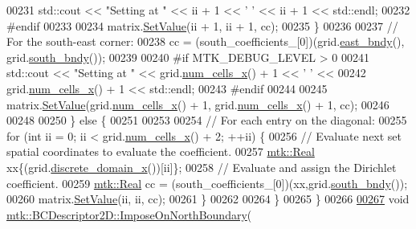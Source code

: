 \begin{DoxyCode}
00231       std::cout << \textcolor{stringliteral}{"Setting at "} << ii + 1 << \textcolor{charliteral}{' '} << ii + 1 << std::endl;
00232 \textcolor{preprocessor}{      #endif}
00233 
00234       matrix.\hyperlink{classmtk_1_1DenseMatrix_a784ce5784109ac86bfb9d8562b334b13}{SetValue}(ii + 1, ii + 1, cc);
00235     \}
00236 
00237     \textcolor{comment}{// For the south-east corner:}
00238     cc = (south\_coefficients\_[0])(grid.\hyperlink{classmtk_1_1UniStgGrid2D_a03f689eb29a6369b82ce1207c655d5ff}{east\_bndy}(), grid.\hyperlink{classmtk_1_1UniStgGrid2D_a1442eaf219f099d0ebf46a170fdebf92}{south\_bndy}());
00239 
00240 \textcolor{preprocessor}{    #if MTK\_DEBUG\_LEVEL > 0}
00241     std::cout << \textcolor{stringliteral}{"Setting at "} << grid.\hyperlink{classmtk_1_1UniStgGrid2D_a2d182866a398aba8e4829590e85bf939}{num\_cells\_x}() + 1 << \textcolor{charliteral}{' '} <<
00242       grid.\hyperlink{classmtk_1_1UniStgGrid2D_a2d182866a398aba8e4829590e85bf939}{num\_cells\_x}() + 1 << std::endl;
00243 \textcolor{preprocessor}{    #endif}
00244 
00245     matrix.\hyperlink{classmtk_1_1DenseMatrix_a784ce5784109ac86bfb9d8562b334b13}{SetValue}(grid.\hyperlink{classmtk_1_1UniStgGrid2D_a2d182866a398aba8e4829590e85bf939}{num\_cells\_x}() + 1, grid.\hyperlink{classmtk_1_1UniStgGrid2D_a2d182866a398aba8e4829590e85bf939}{num\_cells\_x}() + 1, cc);
00246 
00248 
00250   \} \textcolor{keywordflow}{else} \{
00251 
00253 
00254     \textcolor{comment}{// For each entry on the diagonal:}
00255     \textcolor{keywordflow}{for} (\textcolor{keywordtype}{int} ii = 0; ii < grid.\hyperlink{classmtk_1_1UniStgGrid2D_a2d182866a398aba8e4829590e85bf939}{num\_cells\_x}() + 2; ++ii) \{
00256       \textcolor{comment}{// Evaluate next set spatial coordinates to evaluate the coefficient.}
00257       \hyperlink{group__c01-roots_gac080bbbf5cbb5502c9f00405f894857d}{mtk::Real} xx\{(grid.\hyperlink{classmtk_1_1UniStgGrid2D_ab2f70cf5cd0a2d5486992d9f2f8baa4a}{discrete\_domain\_x}())[ii]\};
00258       \textcolor{comment}{// Evaluate and assign the Dirichlet coefficient.}
00259       \hyperlink{group__c01-roots_gac080bbbf5cbb5502c9f00405f894857d}{mtk::Real} cc = (south\_coefficients\_[0])(xx,grid.\hyperlink{classmtk_1_1UniStgGrid2D_a1442eaf219f099d0ebf46a170fdebf92}{south\_bndy}());
00260       matrix.\hyperlink{classmtk_1_1DenseMatrix_a784ce5784109ac86bfb9d8562b334b13}{SetValue}(ii, ii, cc);
00261     \}
00262 
00264   \}
00265 \}
00266 
\hypertarget{mtk__bc__descriptor__2d_8cc_source_l00267}{}\hyperlink{classmtk_1_1BCDescriptor2D_a6062894dbe7c6f42a3bbcc54f2f8973d}{00267} \textcolor{keywordtype}{void} \hyperlink{classmtk_1_1BCDescriptor2D_a6062894dbe7c6f42a3bbcc54f2f8973d}{mtk::BCDescriptor2D::ImposeOnNorthBoundary}(

\end{DoxyCode}
